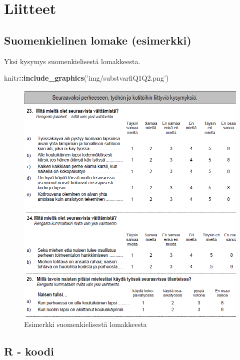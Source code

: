 \documentclass[
  finnish,
]{book}
\newenvironment{Shaded}{\begin{snugshade}}{\end{snugshade}}
\newcommand{\KeywordTok}[1]{\textcolor[rgb]{0.13,0.29,0.53}{\textbf{#1}}}
\newcommand{\NormalTok}[1]{#1}
\newcommand{\OperatorTok}[1]{\textcolor[rgb]{0.81,0.36,0.00}{\textbf{#1}}}
\newcommand{\StringTok}[1]{\textcolor[rgb]{0.31,0.60,0.02}{#1}}
\begin{document}
\hypertarget{liitteet}{%
\chapter*{Liitteet}\label{liitteet}}

\hypertarget{suomenkielinen-lomake-esimerkki}{%
\section{Suomenkielinen lomake (esimerkki)}\label{suomenkielinen-lomake-esimerkki}}

Yksi kysymys suomenkielisestä lomakkeesta.

\begin{Shaded}
\begin{Highlighting}[]
\NormalTok{knitr}\OperatorTok{::}\KeywordTok{include_graphics}\NormalTok{(}\StringTok{'img/substvarfiQ1Q2.png'}\NormalTok{)}
\end{Highlighting}
\end{Shaded}

\begin{figure}

{\centering \includegraphics[width=0.6\linewidth]{img/substvarfiQ1Q2} 

}

\caption{Esimerkki suomenkielisestä lomakkeesta}\label{fig:L1suomlom1}
\end{figure}

\hypertarget{r---koodi}{%
\section{R - koodi}\label{r---koodi}}
\end{document}
